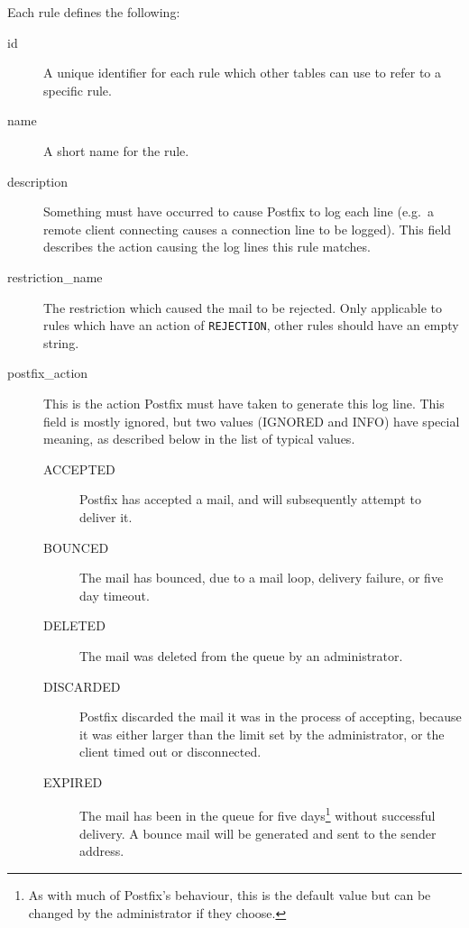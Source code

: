 \documentclass[a4paper,12pt,draft]{article}
\begin{document}
Each rule defines the following:

\begin{description}

    \item [id] A unique identifier for each rule which other tables can use
        to refer to a specific rule.

    \item [name] A short name for the rule.

    \item [description] Something must have occurred to cause Postfix to
        log each line (e.g.\ a remote client connecting causes a connection
        line to be logged).  This field describes the action causing the
        log lines this rule matches.

    \item [restriction\_name] The restriction which caused the mail to be
        rejected.  Only applicable to rules which have an action of
        \texttt{REJECTION}, other rules should have an empty string.

    \item [postfix\_action] This is the action Postfix must have taken to
        generate this log line.  This field is mostly ignored, but two
        values (IGNORED and INFO) have special meaning, as described below
        in the list of typical values.\label{postfix_action}

        \begin{description}

            \item [ACCEPTED] Postfix has accepted a mail, and will
                subsequently attempt to deliver it.

            \item [BOUNCED] The mail has bounced, due to a mail loop,
                delivery failure, or five day timeout.

            \item [DELETED] The mail was deleted from the queue by an
                administrator.

            \item [DISCARDED] Postfix discarded the mail it was in the
                process of accepting, because it was either larger than the
                limit set by the administrator, or the client timed out or
                disconnected.

            \item [EXPIRED] The mail has been in the queue for five
                days\footnote{As with much of Postfix's behaviour, this is
                the default value but can be changed by the administrator
                if they choose.} without successful delivery.  A bounce
                mail will be generated and sent to the sender address.


\end{description}
\end{description}
\end{document}
